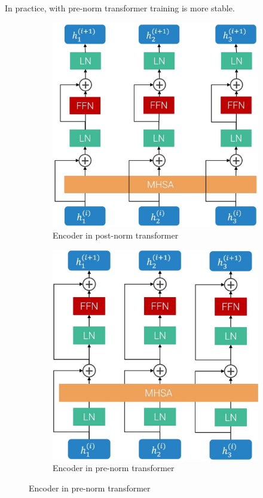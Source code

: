 \begin{description}
\begin{descriptionlist}
                \begin{remark}
                    In practice, with pre-norm transformer training is more stable.
                \end{remark}
        \end{descriptionlist}

        \begin{figure}[H]
            \centering
            \begin{subfigure}{0.40\linewidth}
                \centering
                \includegraphics[width=0.8\linewidth]{./img/_post_norm_encoder.jpg}
                \caption{Encoder in post-norm transformer}
            \end{subfigure}
            \begin{subfigure}{0.40\linewidth}
                \centering
                \includegraphics[width=0.8\linewidth]{./img/_pre_norm_encoder.jpg}
                \caption{Encoder in pre-norm transformer}
            \end{subfigure}
        \end{figure}


\end{description}

